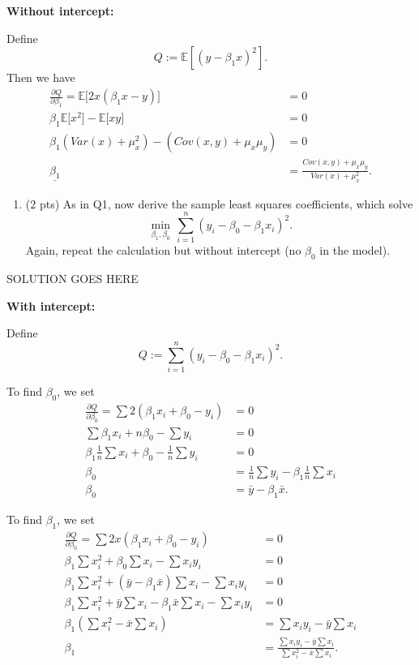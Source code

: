\documentclass[
]{article}
\providecommand{\tightlist}{%
  \setlength{\itemsep}{0pt}\setlength{\parskip}{0pt}}
\begin{document}
\textbf{Without intercept:}

Define \[Q:=\mathbb{E}\left[(y-\beta_1x)^2\right].\] Then we have
\begin{align*}
    \frac{\partial Q}{\partial \beta_1} = \mathbb{E} \big[2 x (\beta_1 x - y) \big] & = 0 \\
    \beta_1\mathbb{E}\big[x^2 \big] - \mathbb{E}\big[xy \big] & = 0 \\
    \beta_1\left(Var(x)+\mu_x^2\right) - \left(Cov(x,y) + \mu_x\mu_y\right) & = 0 \\
    \underline{\beta_1} & = \frac{Cov(x,y)+\mu_x\mu_y}{Var(x)+\mu_x^2}.
\end{align*}

\begin{enumerate}
\def\labelenumi{\arabic{enumi}.}
\setcounter{enumi}{1}
\tightlist
\item
  (2 pts) As in Q1, now derive the sample least squares coefficients,
  which solve \[
  \min_{\beta_1, \beta_0} \, \sum_{i=1}^n (y_i - \beta_0 - \beta_1 x_i)^2.
  \] Again, repeat the calculation but without intercept (no \(\beta_0\)
  in the model).
\end{enumerate}

SOLUTION GOES HERE

\textbf{With intercept:}

Define \[Q := \sum_{i=1}^n (y_i - \beta_0 - \beta_1 x_i)^2.\]

To find \(\beta_0\), we set \begin{align*}
    \frac{\partial Q}{\partial \beta_0} = \sum 2(\beta_1x_i+\beta_0-y_i) & = 0 \\
    \sum\beta_1x_i + n\beta_0-\sum y_i & = 0 \\
    \beta_1\frac{1}{n}\sum x_i + \beta_0 - \frac{1}{n}\sum y_i & = 0 \\
    \beta_0 & = \frac{1}{n}\sum y_i - \beta_1\frac{1}{n}\sum x_i \\
    \beta_0 & = \bar{y} - \beta_1\bar{x}.
\end{align*}

To find \(\beta_1\), we set \begin{align*}
    \frac{\partial Q}{\partial \beta_0} = \sum 2x(\beta_1x_i+\beta_0-y_i) & = 0 \\
    \beta_1\sum x_i^2+\beta_0\sum x_i - \sum x_iy_i & = 0 \\
    \beta_1\sum x_i^2 + \left(\bar{y} - \beta_1\bar{x}\right)\sum x_i - \sum x_iy_i & = 0 \\
    \beta_1\sum x_i^2 + \bar{y}\sum x_i - \beta_1\bar{x}\sum x_i - \sum x_iy_i & = 0 \\
    \beta_1\left(\sum x_i^2 - \bar{x}\sum x_i\right) & = \sum x_iy_i - \bar{y}\sum x_i \\
    \beta_1 & = \frac{\sum x_iy_i - \bar{y}\sum x_i}{\sum x_i^2 - \bar{x}\sum x_i}.
\end{align*}
\end{document}
